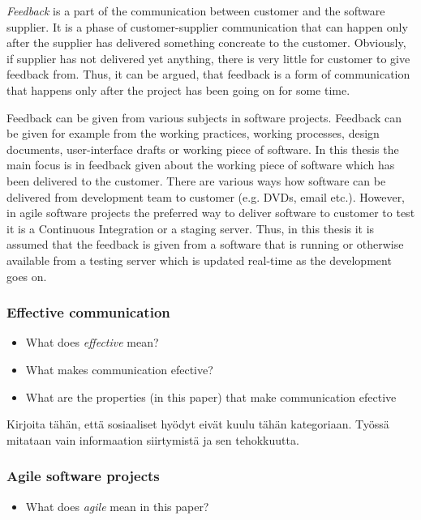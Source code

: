 \documentclass[english,12pt,a4paper,pdftex]{article}
\begin{document}
\textit{Feedback} is a part of the communication between customer and the software supplier. It is a phase of customer-supplier communication that can happen only after the supplier has delivered something concreate to the customer. Obviously, if supplier has not delivered yet anything, there is very little for customer to give feedback from. Thus, it can be argued, that feedback is a form of communication that happens only after the project has been going on for some time.

Feedback can be given from various subjects in software projects. Feedback can be given for example from the working practices, working processes, design documents, user-interface drafts or working piece of software. In this thesis the main focus is in feedback given about the working piece of software which has been delivered to the customer. There are various ways how software can be delivered from development team to customer (e.g. DVDs, email etc.). However, in agile software projects the preferred way to deliver software to customer to test it is a Continuous Integration or a staging server. \citep{CI lähde} Thus, in this thesis it is assumed that the feedback is given from a software that is running or otherwise available from a testing server which is updated real-time as the development goes on.

\subsubsection{Effective communication}

\begin{itemize}
\item What does \textit{effective} mean? 
\item What makes communication efective? 
\item What are the properties (in this paper) that make communication efective
\end{itemize}

Kirjoita tähän, että sosiaaliset hyödyt eivät kuulu tähän kategoriaan. Työssä mitataan vain informaation siirtymistä ja sen tehokkuutta.

\subsubsection{Agile software projects}

\begin{itemize}
\item What does \textit{agile} mean in this paper?
\end{itemize}
\end{document}
